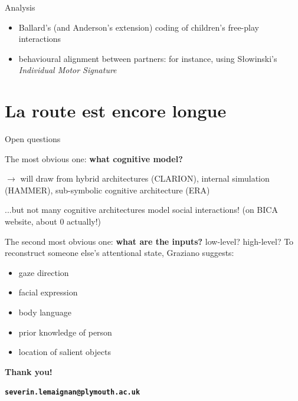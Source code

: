 \documentclass[compress]{beamer}
\begin{document}


\begin{frame}{Analysis}

    \begin{itemize}
        \item Ballard's (and Anderson's extension) coding of children's free-play interactions
        \item behavioural alignment between partners: for instance, using
            Słowinski's \emph{Individual Motor Signature}
    \end{itemize}
\end{frame}

\section{La route est encore longue}
\begin{frame}{Open questions}

    The most obvious one: {\bf what cognitive model?}

    $\rightarrow$ will draw from hybrid architectures (CLARION), internal
    simulation (HAMMER), sub-symbolic cognitive architecture (ERA)

    ...but not many cognitive architectures model social interactions! (on BICA
    website, about 0 actually!)

    \pause
    
    The second most obvious one: {\bf what are the inputs?} low-level?
    high-level? To reconstruct someone else's attentional state, Graziano suggests:

    \begin{itemize}
        \item gaze direction
        \item facial expression
        \item body language
        \item prior knowledge of person
        \item location of salient objects
    \end{itemize}

\end{frame}

\begin{frame}[plain]{}

    {\bf Thank you!}

    {\bf\tt\scriptsize severin.lemaignan@plymouth.ac.uk}

\end{frame}
\end{document}
